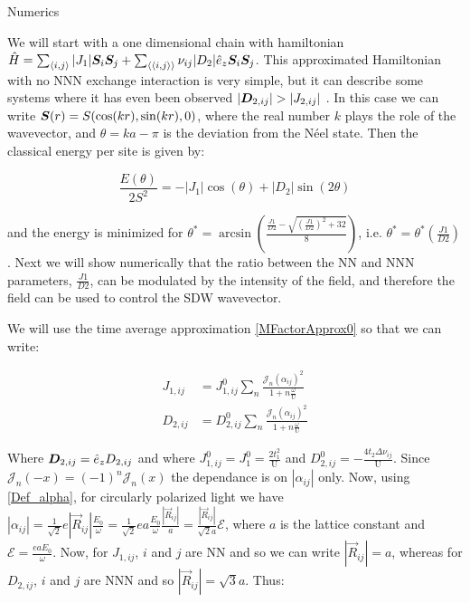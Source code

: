 \begin{section}{Numerics}
\label{Numerics}

We will start with a one dimensional chain with hamiltonian $\hat{H} = \sum_{\langle i,j \rangle} |J_1| \boldsymbol{S}_i\boldsymbol{S}_j + \sum_{\langle \langle i,j \rangle \rangle} \nu_{ij}|D_2|\hat{e}_z\boldsymbol{S}_i\boldsymbol{S}_j$. This approximated Hamiltonian with no NNN exchange interaction is very simple, but it can describe some systems where it has even been observed $|\boldsymbol{D}_{2,ij}| > |J_{2,ij}|$ \cite{Chen2018}. In this case we can write $\boldsymbol{S}(r) = S(\cos(kr), \sin(kr), 0)$, where the real number $k$ plays the role of the wavevector, and $\theta = ka-\pi$ is the deviation from the N\'eel state. Then the classical energy per site is given by:

\begin{equation}
\frac{E(\theta)}{2S^2} = -|J_1|\cos(\theta) + |D_2|\sin(2 \theta)
\end{equation}

and the energy is minimized for $\theta^* = \arcsin(\frac{\frac{J1}{D2} - \sqrt{(\frac{J1}{D2})^2+32}}{8})$, i.e. $\theta^* = \theta^*(\frac{J1}{D2})$. Next we will show numerically that the ratio between the NN and NNN parameters, $\frac{J1}{D2}$, can be modulated by the intensity of the field, and therefore the field can be used to control the SDW wavevector. 

We will use the time average approximation \ref{MFactorApprox0} so that we can write:

\begin{align}
J_{1,ij} &= J_{1,ij}^0  \sum_{n} \frac{\mathcal{J}_n(\alpha_{ij})^2}{1+n\frac{\omega}{\text{U}}} \\
D_{2,ij} &= D_{2,ij}^0  \sum_{n} \frac{\mathcal{J}_n(\alpha_{ij})^2}{1+n\frac{\omega}{\text{U}}}
\end{align}

Where $\boldsymbol{D}_{2,ij} = \hat{e}_z D_{2,ij}$ and where $J_{1,ij}^0 = J_{1}^0 = \frac{2t_1^2}{\text{U}}$ and $D_{2,ij}^0 = -\frac{4t_2\Delta\nu_{ij}}{\text{U}}$. Since $\mathcal{J}_n(-x) = (-1)^n\mathcal{J}_n(x)$ the dependance is on $|\alpha_{ij}|$ only. Now, using \ref{Def_alpha}, for circularly polarized light we have $|\alpha_{ij}| = \frac{1}{\sqrt{2}}e|\vec{R}_{ij}| \frac{E_0}{\omega} = \frac{1}{\sqrt{2}}ea \frac{E_0}{\omega} \frac{|\vec{R}_{ij}|}{a} = \frac{|\vec{R}_{ij}|}{\sqrt{2}a} \mathcal{E}$, where $a$ is the lattice constant and $\mathcal{E} = \frac{eaE_0}{\omega}$. Now, for $J_{1,ij}$, $i$ and $j$ are NN and so we can write $|\vec{R}_{ij}|=a$, whereas for $D_{2,ij}$, $i$ and $j$ are NNN and so $|\vec{R}_{ij}|=\sqrt{3}a$. Thus:


\end{section}
